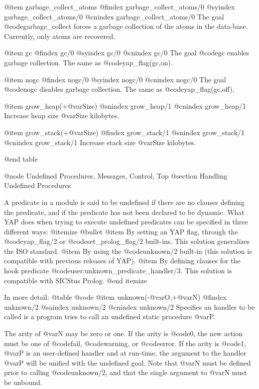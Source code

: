 {{{{@item garbage_collect_atoms
@findex garbage_collect_atoms/0
@syindex garbage_collect_atoms/0
@cnindex garbage_collect_atoms/0
The goal @code{garbage_collect} forces a garbage collection of the atoms
in the data-base. Currently, only atoms are recovered.

@item gc
@findex gc/0
@syindex gc/0
@cnindex gc/0
The goal @code{gc} enables garbage collection. The same as
@code{yap_flag(gc,on)}.

@item nogc
@findex nogc/0
@syindex nogc/0
@cnindex nogc/0
The goal @code{nogc} disables garbage collection. The same as
@code{yap_flag(gc,off)}.

@item grow_heap(+@var{Size})
@snindex grow_heap/1
@cnindex grow_heap/1
Increase heap size @var{Size} kilobytes.

@item grow_stack(+@var{Size})
@findex grow_stack/1
@snindex grow_stack/1
@cnindex grow_stack/1
Increase stack size @var{Size} kilobytes.

@end table

@node Undefined Procedures, Messages, Control, Top
@section Handling Undefined Procedures

A predicate in a module is said to be undefined if there are no clauses
defining the predicate, and if the predicate has not been declared to be
dynamic. What YAP does when trying to execute undefined predicates can
be specified in three different ways:
@itemize @bullet
@item By setting an YAP flag, through the @code{yap_flag/2} or
@code{set_prolog_flag/2} built-ins. This solution generalizes the
ISO standard.
@item By using the @code{unknown/2} built-in (this solution is
compatible with previous releases of YAP).
@item By defining clauses for the hook predicate
@code{user:unknown_predicate_handler/3}. This solution is compatible
with SICStus Prolog.
@end itemize

In more detail:
@table @code
@item unknown(-@var{O},+@var{N})
@findex unknown/2
@saindex unknown/2
@cnindex unknown/2
Specifies an handler to be called is a program tries to call an
undefined static procedure @var{P}.

The arity of @var{N} may be zero or one. If the arity is @code{0}, the
new action must be one of @code{fail}, @code{warning}, or
@code{error}. If the arity is @code{1}, @var{P} is an user-defined
handler and at run-time, the argument to the handler @var{P} will be
unified with the undefined goal. Note that @var{N} must be defined prior
to calling @code{unknown/2}, and that the single argument to @var{N} must
be unbound.

}}}}
